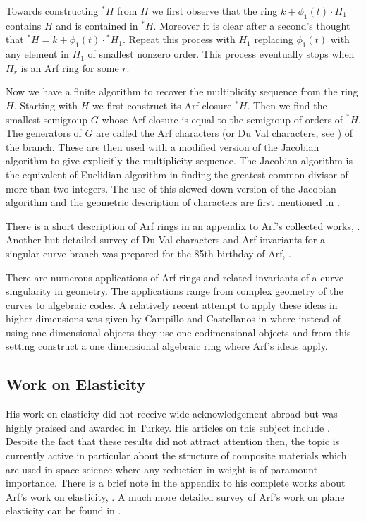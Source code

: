 \documentclass[12pt]{amsart}
\begin{document}
Towards constructing ${\mbox{}^\ast \! } H$ from $H$ we first observe that the ring $k+\phi_1(t)\cdot H_1$ contains $H$ and is contained in ${\mbox{}^\ast \! } H$. Moreover it is clear after a second's thought that ${\mbox{}^\ast \! } H=k+\phi_1(t)\cdot {\mbox{}^\ast \! } H_1$. Repeat this process with $H_1$ replacing $\phi_1(t)$ with any element in $H_1$ of smallest nonzero order. This process eventually stops when $H_r$ is an Arf ring for some $r$.

Now we have a finite algorithm to recover the multiplicity sequence from the ring $H$. Starting with $H$ we first construct its Arf closure ${\mbox{}^\ast \! } H$. Then we find the smallest semigroup $G$ whose Arf closure is equal to the semigroup of orders of ${\mbox{}^\ast \! } H$. The generators of $G$ are called the Arf characters (or Du Val characters, see \cite{duval1}) of the branch. These are then used with a modified version of the Jacobian algorithm to give explicitly the multiplicity sequence. The Jacobian algorithm is the equivalent of Euclidian algorithm in finding the greatest common divisor of more than two integers. The use of this slowed-down version of the Jacobian algorithm and the geometric description of characters are first mentioned in \cite{duval1}.

There is a short description of Arf rings in an appendix to Arf's collected works, \cite{sertoz1}. Another but detailed survey of Du Val characters and Arf invariants for a singular curve branch was prepared for the 85th birthday of Arf, \cite{sertoz2}.

There are numerous applications of Arf rings and related invariants of a curve singularity in geometry. The applications range from complex geometry of the curves to algebraic codes. A relatively recent attempt to apply these ideas in higher dimensions was given by Campillo and Castellanos in \cite{campillo} where instead of using one dimensional objects they use one codimensional objects and  from this setting construct a one dimensional algebraic ring where Arf's ideas apply.

\subsection{Work on Elasticity}
His work on elasticity did not receive wide acknowledgement abroad but was highly praised and awarded in Turkey. His articles on this subject include \cite{carf6,carf9,carf10,carf12,carf13,carf16}. Despite the fact that these results did not attract attention then, the topic is currently active in particular about the structure of composite materials which are used in space science where any reduction in weight is of paramount importance.  There is  a brief note in the appendix to his complete works about Arf's work on elasticity, \cite{tezer}. A much more detailed survey of Arf's work on plane elasticity can be found in \cite{suhubi}.
\end{document}
